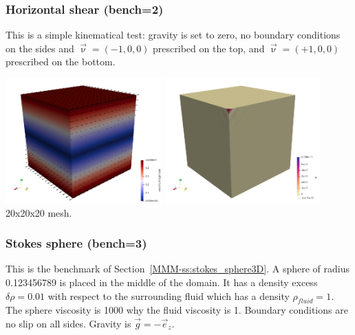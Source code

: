 \subsubsection*{Horizontal shear (bench=2)}

This is a simple kinematical test: gravity is set to zero, no boundary 
conditions on the sides and $\vec\upnu=(-1,0,0)$ prescribed on the top, and 
$\vec\upnu=(+1,0,0)$ prescribed on the bottom.

\begin{center}
\includegraphics[width=6cm]{python_codes/fieldstone_82/results/bench2/vel}
\includegraphics[width=6cm]{python_codes/fieldstone_82/results/bench2/press}\\
{\captionfont 20x20x20 mesh.} 
\end{center}

\subsubsection*{Stokes sphere (bench=3)}

This is the benchmark of Section~\ref{MMM-ss:stokes_sphere3D}.
A sphere of radius 0.123456789 is placed in the middle of the domain. 
It has a density excess $\delta\rho=0.01$
with respect to the surrounding fluid which has a density $\rho_{fluid}=1$. 
The sphere viscosity is 1000 why the fluid viscosity is 1.
Boundary conditions are no slip on all sides. Gravity is $\vec{g}=-\vec{e}_z$.

